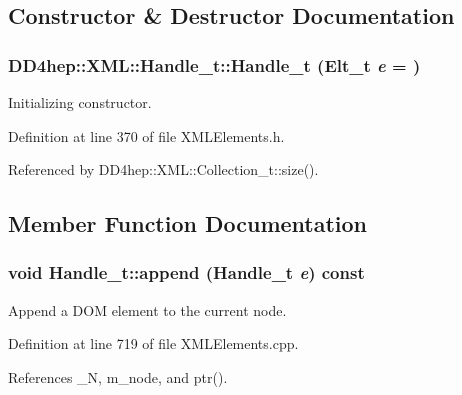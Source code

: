 \subsection{Constructor \& Destructor Documentation}
\hypertarget{class_d_d4hep_1_1_x_m_l_1_1_handle__t_a0fc9a01b5b31be8aff39ffc2b1f9e324}{
\subsubsection[{Handle\_\-t}]{\setlength{\rightskip}{0pt plus 5cm}DD4hep::XML::Handle\_\-t::Handle\_\-t ({\bf Elt\_\-t} {\em e} = {})}}
\label{class_d_d4hep_1_1_x_m_l_1_1_handle__t_a0fc9a01b5b31be8aff39ffc2b1f9e324}


Initializing constructor. 

Definition at line 370 of file XMLElements.h.

Referenced by DD4hep::XML::Collection\_\-t::size().

\subsection{Member Function Documentation}
\hypertarget{class_d_d4hep_1_1_x_m_l_1_1_handle__t_a14ec550e05cfc9dfc0e41a52de03763e}{
\subsubsection[{append}]{\setlength{\rightskip}{0pt plus 5cm}void Handle\_\-t::append ({\bf Handle\_\-t} {\em e}) const}}
\label{class_d_d4hep_1_1_x_m_l_1_1_handle__t_a14ec550e05cfc9dfc0e41a52de03763e}


Append a DOM element to the current node. 

Definition at line 719 of file XMLElements.cpp.

References \_\-N, m\_\-node, and ptr().

